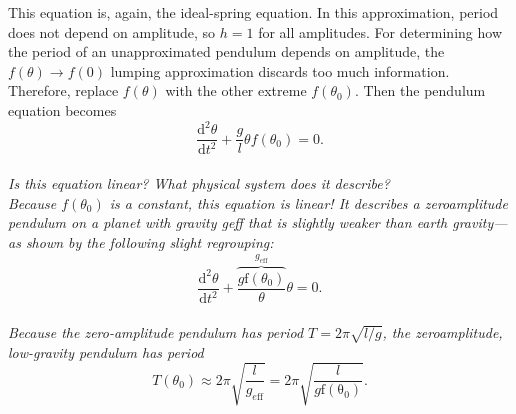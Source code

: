\documentclass[a4paper, 11pt]{book}
\begin{document}
This equation is, again, the ideal-spring equation. In this approximation, period does not depend on amplitude, so $h = 1$ for
all amplitudes. For determining how the period of an unapproximated
pendulum depends on amplitude, the $f(\theta) → f(0)$ lumping approximation
discards too much information.\\

Therefore, replace $f(\theta)$ with the other extreme
$f(\theta_0)$. Then the pendulum equation becomes
\begin{equation}
\frac{\mathrm{d}^2\theta }{\mathrm{d} t^2}+\frac{g}{l}\theta f(\theta_0)=0.
\end{equation}\\
\it {Is this equation linear? What physical system does
it describe?}\\

\rm Because $f(\theta_0)$ is a constant, this equation is linear! It describes a zeroamplitude
pendulum on a planet with gravity geff that is slightly weaker
than earth gravity—as shown by the following slight regrouping:
\begin{equation}
\frac{\mathrm{d}^2\theta }{\mathrm{d} t^2}+\overbrace{\frac{g\mathrm{f}(\theta_0)}{\theta}}^{g_{e\mathrm{ff}}}\theta=0.
\end{equation}\\
Because the zero-amplitude pendulum has period $T=2\pi \sqrt{l/g}$, the zeroamplitude,
low-gravity pendulum has period
\begin{equation}
T(\theta_0)\approx 2\pi \sqrt{\frac{l}{g_{e\mathrm{ff}}}}=2\pi \sqrt{\frac{l}{g\mathrm{f(\theta_0)}}}.
\end{equation}
\end{document}
